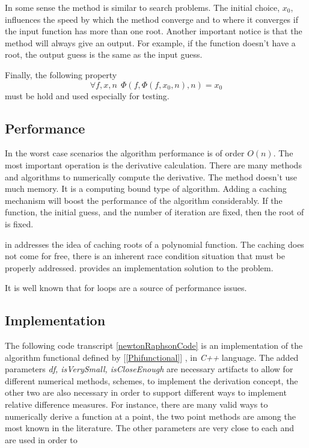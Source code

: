 \documentclass[12pt]{article}
\begin{document}
  In some sense the method is similar to search problems.  
  The initial choice, \(x_0\), influences the speed by which the method converge and to where it converges if the input function has more than one root.
  Another important notice is that the method will always give an output.  For example, if the function doesn't have a root, the output guess is the same as the input guess.
  
  Finally, the following property 
  \[
  	\forall f, x, n ~~\Phi(f, \Phi(f, x_0, n), n) = x_0
  \]
  must be hold and used especially for testing.
  
  	\subsection {Performance}
  		In the worst case scenarios the algorithm performance is of order \(O(n)\).  The most important operation is the derivative calculation.  
  		There are many methods and algorithms to numerically compute the derivative.   
  		The method doesn't use much memory.  It is a computing bound type of algorithm.    
  		 Adding a caching mechanism will boost the performance of the algorithm considerably.  
  		 If the function, the initial guess, and the number of iteration are fixed, then the root of is fixed.  
  		 
  		 \citeauthor{meyers2014effective}  in \cite{meyers2014effective}  addresses the idea of caching roots of a polynomial function.  
		 The caching does not come for free, there is an inherent race condition situation that must be properly addressed. 
		 \citeauthor{meyers2014effective} provides an implementation solution to the problem.
		 
		 It is well known that for loops are a source of performance issues.  
  
	\subsection {Implementation}
		
  		The following code transcript \ref{newtonRaphsonCode} is an implementation of the algorithm  functional defined by [\ref{Phifunctional}] , in \textit {C++} language.  
  		The added parameters \textit {df, isVerySmall, isCloseEnough} are necessary artifacts to allow for different
  		numerical methods, schemes, to implement the derivation concept, the other two are also necessary in order to support different ways to implement relative difference measures.
  		For instance, there are many valid ways to numerically derive a function at a point, the two point methods are among the most known in the literature.
  		The other parameters are very close to each and are used in order to
  
\end{document}
